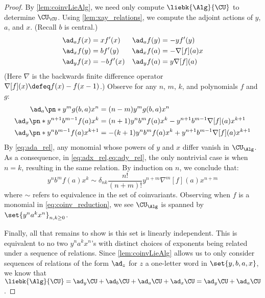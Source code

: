 \begin{proof}
By \cref{lem:coinvLieAlg}, we need only compute $\liebk{\Alg}{\CU}$ to
determine $\CU_\CU$. Using \cref{lem:xay_relations}, we compute the adjoint
actions of $y$, $a$, and $x$. (Recall $b$ is central.)
\begin{align}
  \ad_a f(x) &= xf'(x)&
  \ad_a f(y) &= -yf'(y)\label{eq:ada}\\
  \ad_x f(y) &= bf'(y) &
  \ad_x f(a) &= -\nabla[f](a)x\label{eq:adx}\\
  \ad_y f(x) &= -bf'(x) &
  \ad_y f(a) &= y\nabla[f](a)\label{eq:ady}
\end{align}
(Here $\nabla$ is the backwards finite difference operator $\nabla[f](x) \defeq
f(x) - f(x-1)$.) Observe for any $n$, $m$, $k$, and polynomials $f$ and $g$:
\begin{align}
        \ad_a \pn*{y^m g(b, a) x^n } &= (n-m)y^mg(b, a) x^n
        \label{eq:ada_rel}\\
        \ad_{x}\pn*{y^{n+1}b^{m-1}f(a)x^{k}} &=
                (n+1)y^{n}b^{m}f(a)x^{k} - y^{n+1}b^{m-1}\nabla[f](a)x^{k+1}
        \label{eq:adx_rel}\\
        \ad_{y}\pn*{y^n b^{m-1} f(a) x^{k+1}} &=
                - (k+1)y^n b^m f(a) x^k + y^{n+1} b^{m-1} \nabla[f](a)x^{k+1}
        \label{eq:ady_rel}
\end{align}
By \cref{eq:ada_rel}, any monomial whose powers of $y$ and $x$ differ vanish in
$\CU_{\Alg}$. As a consequence, in \cref{eq:adx_rel,eq:ady_rel}, the only
nontrivial case is when $n=k$, resulting in the same relation. By induction on
$n$, we conclude that:
\begin{equation}\label{eq:coinv_reduction}
        y^n b^m f(a) x^k \sim δ_{nk}\frac{n!}{(n+m)!}y^{n+m}\nabla^m[f](a)x^{n+m}
\end{equation}
where $\sim$ refers to equivalence in the set of coinvariants. Observing when
$f$ is a monomial in \cref{eq:coinv_reduction}, we see $\CU_{\Alg}$ is spanned
by $\set{y^n a^k x^n}_{n, k \ge 0}$.

Finally, all that remains to show is this set is linearly independent. This is
equivalent to no two $y^na^kx^n$'s with distinct choices of exponents being
related under a sequence of relations. Since \cref{lem:coinvLieAlg} allows us to
only consider sequences of relations of the form $\ad_z$ for $z$ a one-letter
word in $\set{y, b, a, x}$, we know that $\liebk{\Alg}{\CU} = \ad_y\CU +
\ad_b\CU + \ad_a\CU + \ad_x\CU = \ad_y\CU + \ad_a\CU$.


\end{proof}
